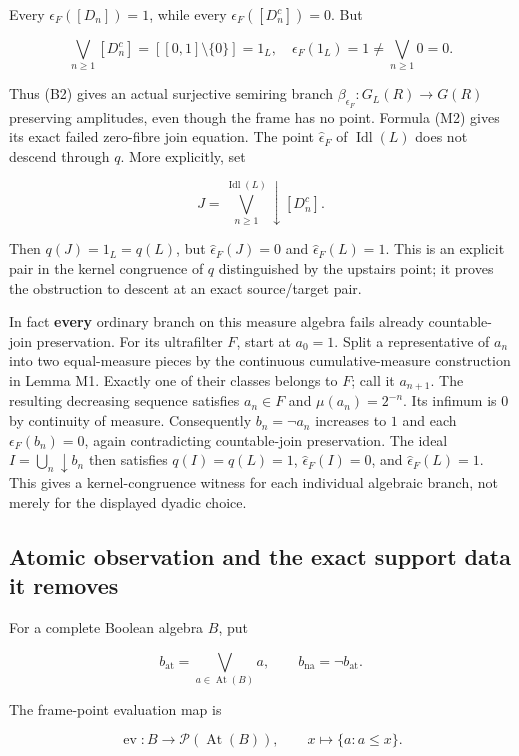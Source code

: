 Every \(\epsilon _F([D_n])=1\), while every \(\epsilon _F([D_n^c])=0\). But

\[
\bigvee_{n\ge1}[D_n^c]=[[0,1]\setminus\{0\}]=1_L,
\quad\epsilon_F(1_L)=1\ne\bigvee_{n\ge1}0=0.
\tag{M2}
\]

Thus (B2) gives an actual surjective semiring branch \(\beta_{\epsilon_F}:G_L(R)\to G(R)\) preserving amplitudes, even though the frame has no point. Formula (M2) gives its exact failed zero-fibre join equation. The point \(\widehat\epsilon_F\) of \(\operatorname{Idl}(L)\) does not descend through \(q\). More explicitly, set

\[
J=\bigvee_{n\ge1}^{\operatorname{Idl}(L)}\downarrow[D_n^c].
\]

Then \(q(J)=1_L=q(L)\), but \(\widehat\epsilon_F(J)=0\) and \(\widehat\epsilon_F(L)=1\). This is an explicit pair in the kernel congruence of \(q\) distinguished by the upstairs point; it proves the obstruction to descent at an exact source/target pair.

In fact \textbf{every} ordinary branch on this measure algebra fails already countable-join preservation. For its ultrafilter \(F\), start at \(a_0=1\). Split a representative of \(a_n\) into two equal-measure pieces by the continuous cumulative-measure construction in Lemma M1. Exactly one of their classes belongs to \(F\); call it \(a_{n+1}\). The resulting decreasing sequence satisfies \(a_n\in F\) and \(\mu(a_n)=2^{-n}\). Its infimum is \(0\) by continuity of measure. Consequently \(b_n=\neg a_n\) increases to \(1\) and each \(\epsilon _F(b_n)=0\), again contradicting countable-join preservation. The ideal \(I=\bigcup_n\downarrow b_n\) then satisfies \(q(I)=q(L)=1\), \(\widehat\epsilon_F(I)=0\), and \(\widehat\epsilon_F(L)=1\). This gives a kernel-congruence witness for each individual algebraic branch, not merely for the displayed dyadic choice.

\subsection{Atomic observation and the exact support data it removes}\label{historical-support-atomic-observation-and-the-exact-support-data-it-removes}

For a complete Boolean algebra \(B\), put

\[
b_{\mathrm{at}}=\bigvee_{a\in\operatorname{At}(B)}a,\qquad
b_{\mathrm{na}}=\neg b_{\mathrm{at}}.
\]

The frame-point evaluation map is

\[
\operatorname{ev}:B\to\mathcal P(\operatorname{At}(B)),\qquad
x\mapsto\{a:a\le x\}.
\tag{A1}
\]


